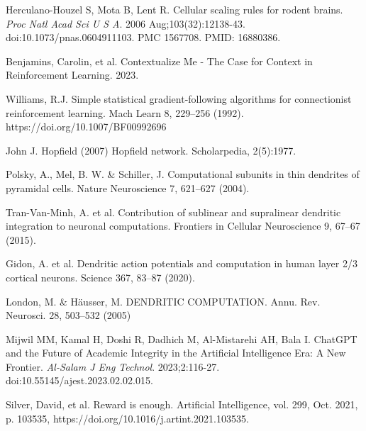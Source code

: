\documentclass{article}
\begin{document}
\begin{multicols}{2}
\begin{thebibliography}{11}
Herculano-Houzel S, Mota B, Lent R. 
Cellular scaling rules for rodent brains. 
\textit{Proc Natl Acad Sci U S A}. 2006 Aug;103(32):12138-43. 
doi:10.1073/pnas.0604911103. PMC 1567708. PMID: 16880386.

Benjamins, Carolin, et al. Contextualize Me - The Case for Context in Reinforcement Learning. 2023.

Williams, R.J. Simple statistical gradient-following algorithms for connectionist reinforcement learning. Mach Learn 8, 229–256 (1992). https://doi.org/10.1007/BF00992696

John J. Hopfield (2007) Hopfield network. Scholarpedia, 2(5):1977.

Polsky, A., Mel, B. W. \& Schiller, J. Computational subunits in thin dendrites of pyramidal cells. Nature Neuroscience 7, 621–627 (2004).

Tran-Van-Minh, A. et al. Contribution of sublinear and supralinear dendritic integration to neuronal computations. Frontiers in Cellular Neuroscience 9, 67–67 (2015).

Gidon, A. et al. Dendritic action potentials and computation in human layer 2/3 cortical neurons. Science 367, 83–87 (2020).

London, M. \& Häusser, M. DENDRITIC COMPUTATION. Annu. Rev. Neurosci. 28, 503–532 (2005)

Mijwil MM, Kamal H, Doshi R, Dadhich M, Al-Mistarehi AH, Bala I. 
ChatGPT and the Future of Academic Integrity in the Artificial Intelligence Era: A New Frontier. 
\textit{Al-Salam J Eng Technol}. 2023;2:116-27. 
doi:10.55145/ajest.2023.02.02.015.





Silver, David, et al. Reward is enough. Artificial Intelligence, vol. 299, Oct. 2021, p. 103535, https://doi.org/10.1016/j.artint.2021.103535.
\end{thebibliography}

\end{multicols}

	
\end{document}
